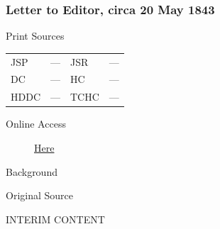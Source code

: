 		\subsubsection{Letter to Editor, circa 20 May 1843}
			\label{EMS-1843-JS-CIR-20-MAY-1843}
			
			\begin{description}
				\item[Print Sources]
			\end{description}

				\begin{tabular}{p{0.5in}p{1in}p{0.5in}p{1in}}
				JSP	 	& ---		& JSR 		& --- \\
				DC	 	& ---		& HC 		& --- \\
				HDDC 	& ---		& TCHC 		& --- \\
				\end{tabular}
			
			\begin{description}
				\item[Online Access] \href{https://www.josephsmithpapers.org/paper-summary/letter-to-editor-circa-20-may-1843/1}{Here}
			\end{description}
			
			\begin{description}
				\item[Background]
			\end{description}
			
			
			\begin{description}
				\item[Original Source]
			\end{description}
			
				INTERIM CONTENT
			
			
